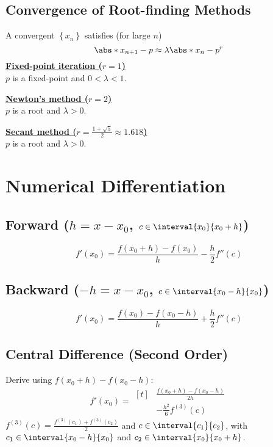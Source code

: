 \documentclass{article}
\begin{document}
\begin{minipage}[t]{62.39259259mm}
    \subsection{Convergence of Root-finding Methods}
    A convergent \(\left\{ x_n \right\}\) satisfies (for large \(n\))
    \begin{equation*}
        \abs*{x_{n + 1} - p} \approx \lambda \abs*{x_n - p}^r
    \end{equation*}
    \underline{\textbf{Fixed-point iteration (\(r = 1\))}} \\
    \(p\) is a fixed-point and \(0 < \lambda < 1\).

    \underline{\textbf{Newton's method (\(r = 2\))}} \\
    \(p\) is a root and \(\lambda > 0\).

    \underline{\textbf{Secant method (\(r = \tfrac{1 + \sqrt{5}}{2} \approx 1.618\))}} \\
    \(p\) is a root and \(\lambda > 0\).
    \section{Numerical Differentiation}
    \subsection{Forward (\texorpdfstring{\(h = x - x_0\)}{h = x - x0}, \texorpdfstring{\(c \in \interval{x_0}{x_0 + h}\)}{c in [x0, x0 + h]})}
    \begin{equation*}
        f'\left( x_0 \right) = \frac{f\left( x_0 + h \right) - f\left( x_0 \right)}{h} - \frac{h}{2} f''\left( c \right)
    \end{equation*}
    \subsection{Backward (\texorpdfstring{\(-h = x - x_0\)}{-h = x - x0}, \texorpdfstring{\(c \in \interval{x_0 - h}{x_0}\)}{c in [x0 - h, x0]})}
    \begin{equation*}
        f'\left( x_0 \right) = \frac{f\left( x_0 \right) - f\left( x_0 - h \right)}{h} + \frac{h}{2} f''\left( c \right)
    \end{equation*}
    \subsection{Central Difference (Second Order)}
    Derive using \(f\left( x_0 + h \right) - f\left( x_0 - h \right)\):
    \begin{equation*}
        f'\left( x_0 \right) = \begin{aligned}[t]
             & \frac{f\left( x_0 + h \right) - f\left( x_0 - h \right)}{2h} \\
             & - \frac{h^2}{6} f^{\left( 3 \right)}\left( c \right)
        \end{aligned}
    \end{equation*}
    \(f^{\left( 3 \right)}\left( c \right) = \frac{f^{\left( 3 \right)}\left( c_1 \right) + f^{\left( 3 \right)}\left( c_2 \right)}{2}\) and \(c \in \interval{c_1}{c_2}\),
    with \(c_1 \in \interval{x_0 - h}{x_0}\) and \(c_2 \in \interval{x_0}{x_0 + h}\).

\end{minipage}
\end{document}
